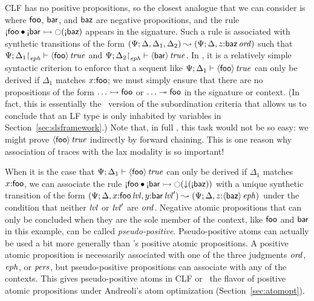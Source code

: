 CLF has no positive propositions, so the closest analogue that we can
consider is where ${\sf foo}$, ${\sf bar}$, and ${\sf baz}$ are
negative propositions, and the rule ${\gnab}{\sf foo} \fuse
{\gnab}{\sf bar} \lefti \ocircle({\gnab}{\sf baz})$ appears in the
signature. Such a rule is associated with synthetic transitions of the
form
%
$(\Psi; {\Delta},{{\Delta_1},{\Delta_2}}) \leadsto
(\Psi; {\Delta},{z{:}{{\sf baz}}\,{{\it ord}}})$ such that
${\Psi};{{\Delta_1}{\upharpoonright}_{{\it eph}}} \vdash {{\langle {\sf foo} \rangle}\,{{\it true}}} \mathstrut$
and ${\Psi};{{\Delta_2}{\upharpoonright}_{{\it eph}}} \vdash {{\langle {\sf
      bar} \rangle}\,{{\it true}}} \mathstrut$. In \sls, it is a relatively simple syntactic criterion
to enforce that a sequent like ${\Psi};{\Delta_1} \vdash {{\langle {\sf
      foo} \rangle}\,{{\it true}}} \mathstrut$ can only be derived if $\Delta_1$ matches
$x{:}\sf{foo}$; we must simply ensure that there are no propositions
of the form $\ldots \rightarrowtail {\sf foo}$ or $\ldots \twoheadrightarrow {\sf foo}$ in
the signature or context. (In fact, this is essentially the
\sls~version of the subordination criteria that allows us to conclude
that an LF type is only inhabited by variables in 
Section~\ref{sec:slsframework}.)  Note that, in full \ollll, this task
would not be so easy: we might prove ${\langle {\sf foo} \rangle}\,{{\it true}}$
indirectly by forward chaining. This is one reason why association of
traces with the lax modality is so important!

When it is the case that  ${\Psi};{\Delta_1} \vdash {{\langle {\sf
      foo} \rangle}\,{{\it true}}} \mathstrut$ can only be derived if $\Delta_1$ matches
$x{:}\sf{foo}$, we can
associate the rule ${\gnab}{\sf foo} \fuse
{\gnab}{\sf bar} \lefti \ocircle({\downarrow}({\gnab}{\sf baz}))$
with a unique synthetic transition of the form $(\Psi;
{\Delta},{{x{:}{{\sf foo}\,{{\it lvl}}}},{y{:}{{\sf
        bar}\,{{\it lvl}}'}}}) \leadsto (\Psi; {\Delta},{z{:}{\langle {\sf
      baz} \rangle}\,{{\it eph}}})$ under the condition that neither ${\it lvl}$ or ${\it lvl}'$
are ${\it ord}$.
Negative atomic propositions that can only be concluded when they are
the sole member of the context, like ${\sf foo}$ and ${\sf bar}$ in
this example, can be called {\it
  pseudo-positive}. Pseudo-positive atoms can actually be used a bit
more generally than \sls's positive atomic propositions. A positive
atomic proposition is necessarily associated with one of the three
judgments ${\it ord}$, ${\it eph}$, or ${\it pers}$, but pseudo-positive
propositions can associate with any of the contexts. This
gives pseudo-positive atoms in CLF or \sls~the flavor of
positive atomic propositions under Andreoli's atom optimization
(Section~\ref{sec:atomopt}).

